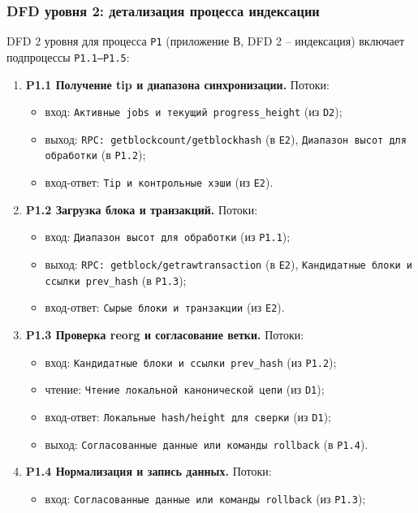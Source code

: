 ﻿\documentclass[14pt,a4paper]{extarticle}
\begin{document}
\subsubsection{DFD уровня 2: детализация процесса индексации}
\noindent DFD 2 уровня для процесса \texttt{P1} (приложение В, DFD 2 -- индексация) включает подпроцессы \texttt{P1.1--P1.5}:
\begin{enumerate}
  \item \textbf{P1.1 Получение tip и диапазона синхронизации.}
  Потоки:
  \begin{itemize}
    \item вход: \texttt{Активные jobs и текущий progress\_height} (из \texttt{D2});
    \item выход: \texttt{RPC: getblockcount/getblockhash} (в \texttt{E2}), \texttt{Диапазон высот для обработки} (в \texttt{P1.2});
    \item вход-ответ: \texttt{Tip и контрольные хэши} (из \texttt{E2}).
  \end{itemize}
  \item \textbf{P1.2 Загрузка блока и транзакций.}
  Потоки:
  \begin{itemize}
    \item вход: \texttt{Диапазон высот для обработки} (из \texttt{P1.1});
    \item выход: \texttt{RPC: getblock/getrawtransaction} (в \texttt{E2}), \texttt{Кандидатные блоки и ссылки prev\_hash} (в \texttt{P1.3});
    \item вход-ответ: \texttt{Сырые блоки и транзакции} (из \texttt{E2}).
  \end{itemize}
  \item \textbf{P1.3 Проверка reorg и согласование ветки.}
  Потоки:
  \begin{itemize}
    \item вход: \texttt{Кандидатные блоки и ссылки prev\_hash} (из \texttt{P1.2});
    \item чтение: \texttt{Чтение локальной канонической цепи} (из \texttt{D1});
    \item вход-ответ: \texttt{Локальные hash/height для сверки} (из \texttt{D1});
    \item выход: \texttt{Согласованные данные или команды rollback} (в \texttt{P1.4}).
  \end{itemize}
  \item \textbf{P1.4 Нормализация и запись данных.}
  Потоки:
  \begin{itemize}
    \item вход: \texttt{Согласованные данные или команды rollback} (из \texttt{P1.3});

\end{itemize}
\end{enumerate}
\end{document}
